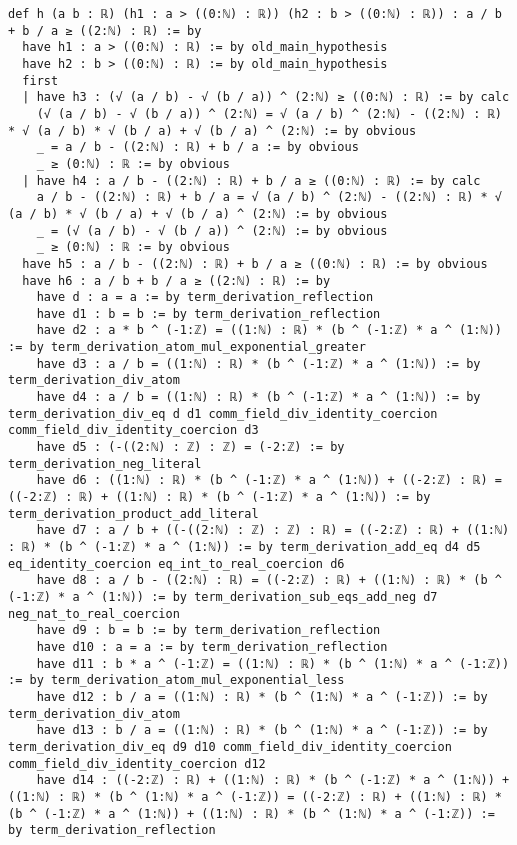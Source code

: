 \documentclass{article}
\begin{document}
\begin{tcolorbox}[colback=white!10, width=\linewidth]
\begin{lstlisting}[language=Lean4]
def h (a b : ℝ) (h1 : a > ((0:ℕ) : ℝ)) (h2 : b > ((0:ℕ) : ℝ)) : a / b + b / a ≥ ((2:ℕ) : ℝ) := by
  have h1 : a > ((0:ℕ) : ℝ) := by old_main_hypothesis
  have h2 : b > ((0:ℕ) : ℝ) := by old_main_hypothesis
  first
  | have h3 : (√ (a / b) - √ (b / a)) ^ (2:ℕ) ≥ ((0:ℕ) : ℝ) := by calc
    (√ (a / b) - √ (b / a)) ^ (2:ℕ) = √ (a / b) ^ (2:ℕ) - ((2:ℕ) : ℝ) * √ (a / b) * √ (b / a) + √ (b / a) ^ (2:ℕ) := by obvious
    _ = a / b - ((2:ℕ) : ℝ) + b / a := by obvious
    _ ≥ (0:ℕ) : ℝ := by obvious
  | have h4 : a / b - ((2:ℕ) : ℝ) + b / a ≥ ((0:ℕ) : ℝ) := by calc
    a / b - ((2:ℕ) : ℝ) + b / a = √ (a / b) ^ (2:ℕ) - ((2:ℕ) : ℝ) * √ (a / b) * √ (b / a) + √ (b / a) ^ (2:ℕ) := by obvious
    _ = (√ (a / b) - √ (b / a)) ^ (2:ℕ) := by obvious
    _ ≥ (0:ℕ) : ℝ := by obvious
  have h5 : a / b - ((2:ℕ) : ℝ) + b / a ≥ ((0:ℕ) : ℝ) := by obvious
  have h6 : a / b + b / a ≥ ((2:ℕ) : ℝ) := by
    have d : a = a := by term_derivation_reflection
    have d1 : b = b := by term_derivation_reflection
    have d2 : a * b ^ (-1:ℤ) = ((1:ℕ) : ℝ) * (b ^ (-1:ℤ) * a ^ (1:ℕ)) := by term_derivation_atom_mul_exponential_greater
    have d3 : a / b = ((1:ℕ) : ℝ) * (b ^ (-1:ℤ) * a ^ (1:ℕ)) := by term_derivation_div_atom
    have d4 : a / b = ((1:ℕ) : ℝ) * (b ^ (-1:ℤ) * a ^ (1:ℕ)) := by term_derivation_div_eq d d1 comm_field_div_identity_coercion comm_field_div_identity_coercion d3
    have d5 : (-((2:ℕ) : ℤ) : ℤ) = (-2:ℤ) := by term_derivation_neg_literal
    have d6 : ((1:ℕ) : ℝ) * (b ^ (-1:ℤ) * a ^ (1:ℕ)) + ((-2:ℤ) : ℝ) = ((-2:ℤ) : ℝ) + ((1:ℕ) : ℝ) * (b ^ (-1:ℤ) * a ^ (1:ℕ)) := by term_derivation_product_add_literal
    have d7 : a / b + ((-((2:ℕ) : ℤ) : ℤ) : ℝ) = ((-2:ℤ) : ℝ) + ((1:ℕ) : ℝ) * (b ^ (-1:ℤ) * a ^ (1:ℕ)) := by term_derivation_add_eq d4 d5 eq_identity_coercion eq_int_to_real_coercion d6
    have d8 : a / b - ((2:ℕ) : ℝ) = ((-2:ℤ) : ℝ) + ((1:ℕ) : ℝ) * (b ^ (-1:ℤ) * a ^ (1:ℕ)) := by term_derivation_sub_eqs_add_neg d7 neg_nat_to_real_coercion
    have d9 : b = b := by term_derivation_reflection
    have d10 : a = a := by term_derivation_reflection
    have d11 : b * a ^ (-1:ℤ) = ((1:ℕ) : ℝ) * (b ^ (1:ℕ) * a ^ (-1:ℤ)) := by term_derivation_atom_mul_exponential_less
    have d12 : b / a = ((1:ℕ) : ℝ) * (b ^ (1:ℕ) * a ^ (-1:ℤ)) := by term_derivation_div_atom
    have d13 : b / a = ((1:ℕ) : ℝ) * (b ^ (1:ℕ) * a ^ (-1:ℤ)) := by term_derivation_div_eq d9 d10 comm_field_div_identity_coercion comm_field_div_identity_coercion d12
    have d14 : ((-2:ℤ) : ℝ) + ((1:ℕ) : ℝ) * (b ^ (-1:ℤ) * a ^ (1:ℕ)) + ((1:ℕ) : ℝ) * (b ^ (1:ℕ) * a ^ (-1:ℤ)) = ((-2:ℤ) : ℝ) + ((1:ℕ) : ℝ) * (b ^ (-1:ℤ) * a ^ (1:ℕ)) + ((1:ℕ) : ℝ) * (b ^ (1:ℕ) * a ^ (-1:ℤ)) := by term_derivation_reflection

\end{lstlisting}
\end{tcolorbox}
\end{document}
